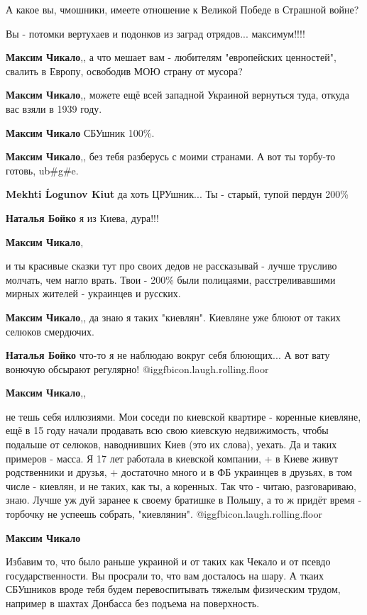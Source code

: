\begin{itemize}
\begin{itemize}
А какое вы, чмошники, имеете отношение к Великой Победе в Страшной войне?

Вы - потомки вертухаев и подонков из заград отрядов... максимум!!!!

\textbf{Максим Чикало},, а что мешает вам - любителям "европейских ценностей", свалить в Европу, освободив МОЮ страну от мусора?

\textbf{Максим Чикало},, можете ещё всей западной Украиной вернуться туда, откуда вас взяли в 1939 году.

\textbf{Максим Чикало} СБУшник 100\%.

\textbf{Максим Чикало},, без тебя разберусь с моими странами. А вот ты торбу-то готовь, ub\#g\#e.

\textbf{Mekhti Ĺogunov Kiut} да хоть ЦРУшник...
Ты - старый, тупой пердун 200\%

\textbf{Наталья Бойко} я из Киева, дура!!!

\textbf{Максим Чикало}, 

и ты красивые сказки тут про своих дедов не рассказывай - лучше трусливо
молчать, чем нагло врать. Твои - 200\% были полицаями, расстреливавшими мирных
жителей - украинцев и русских.

\textbf{Максим Чикало},, да знаю я таких "киевлян". Киевляне уже блюют от таких селюков смердючих.

\textbf{Наталья Бойко} что-то я не наблюдаю вокруг себя блюющих...
А вот вату вонючую обсырают регулярно!  @igg{fbicon.laugh.rolling.floor} 

\textbf{Максим Чикало},, 

не тешь себя иллюзиями. Мои соседи по киевской квартире - коренные киевляне,
ещё в 15 году начали продавать всю свою киевскую недвижимость, чтобы подальше
от селюков, наводнивших Киев (это их слова), уехать. Да и таких примеров -
масса. Я 17 лет работала в киевской компании, + в Киеве живут родственники и
друзья, + достаточно много и в ФБ украинцев в друзьях, в том числе - киевлян, и
не таких, как ты, а коренных. Так что - читаю, разговариваю, знаю. Лучше уж дуй
заранее к своему братишке в Польшу, а то ж придёт время - торбочку не успеешь
собрать, "киевлянин".  @igg{fbicon.laugh.rolling.floor} 

\textbf{Максим Чикало} 

Избавим то, что было раньше украиной и от таких как Чекало и от псевдо
государственности. Вы просрали то, что вам досталось на шару. А ткаих СБУшников
вроде тебя будем перевоспитывать тяжелым физическим трудом, например в шахтах
Донбасса без подъема на поверхность.


\end{itemize}
\end{itemize}
